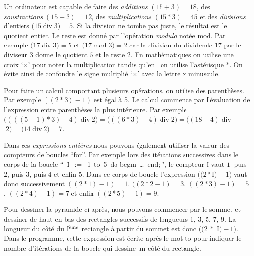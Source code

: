 Un ordinateur est capable de faire des {\em additions} $(15 + 3) = 18$, des {\em soustractions} 
$(15 - 3) = 12$, 
des {\em multiplications} $(15 \ast 3) = 45$ et des {\em divisions} d'entiers $(15 \;${\mcl div}$\; 3) = 5$. 
Si la division ne tombe pas juste,
le résultat est le quotient entier. Le reste est donné
par l'opération {\em modulo} notée {\mcl mod}. Par exemple 
$(17 \;${\mcl div}$\; 3) = 5$ et $(17 \;${\mcl mod}$\; 3) = 2$ car la division du dividende $17$
par le diviseur $3$ donne le quotient $5$ et le reste $2$. En mathématiques on utilise une croix
`$\times$' pour noter la multiplication tandis qu'en \pascal\ on utilise l'astérisque $\ast$.
On évite ainsi de confondre le signe multiplié `$\times$' avec la lettre {\idt x} minuscule.

Pour faire un calcul comportant plusieurs opérations, on utilise des pa\-ren\-thè\-ses. Par exemple
$((2 \ast 3) - 1)$ est égal à 5. Le calcul commence par l'évaluation de l'expression 
entre parenthèses la plus intérieure. 
Par exemple $((((5 + 1) \ast 3) - 4) \;${\mcl div}$\; 2) = (((6 \ast 3) - 4) \;${\mcl div}$\; 2) = 
((18 - 4) \;${\mcl div}$\; 2) = (14 \;${\mcl div}$\; 2) = 7$.  

Dans ces {\em expressions entières}
nous pouvons également utiliser la valeur des compteurs de boucles ``for''. Par exemple 
lors des itérations successives dans le corps de la boucle
``{\ I\ $:=$\ 1\ {\mcl to}\ 5\ {\mcl do begin}\ \ldots\ {\mcl end}$;$}'',
le compteur {\idt I} vaut $1$, puis $2$, puis $3$, puis $4$ et enfin $5$. 
Dans ce corps de boucle l'expression $((2 \ast ${\idt  I}$) - 1)$ vaut donc successivement 
$((2 \ast 1) - 1) = 1$, $((2 \ast 2 - 1) = 3$, $((2 \ast 3) - 1) = 5$, $((2 \ast 4) - 1) = 7$ et enfin
$((2 \ast 5) - 1) = 9$.

\begin{exemple}[Pyramide]
Pour dessiner la pyramide ci-après, nous pouvons commencer par le sommet et dessiner de
haut en bas des rectangles successifs de longueurs 1, 3, 5, 7, 9. La longueur du
côté du {\idt I}$^{\rm\grave{e}me}$ rectangle à partir du sommet est 
donc $((2\;\ast\;${\idt  I}$) - 1)$. Dans le programme, cette expression est écrite
après le mot {\mcl to} pour indiquer le nombre d'itérations de la boucle qui dessine un côté
du rectangle.

\pagebreak[3]
\vspace*{22mm}%
%
\vspace*{-22mm}%

\end{exemple}

